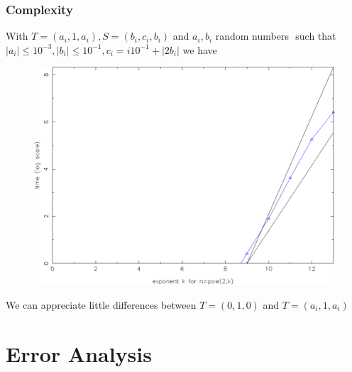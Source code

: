 \documentclass{beamer}
\newcommand{\tc}{ $ such that $ }
\theoremstyle{definition} \newtheorem{de}{Def}
\theoremstyle{remark} \newtheorem{os}[de]{Remark}
\theoremstyle{plain} \newtheorem{te}[de]{Teo}
\theoremstyle{plain} \newtheorem{co}[de]{Cor}
\theoremstyle{plain} \newtheorem{pr}[de]{Prop}
\theoremstyle{plain} \newtheorem{lem}[de]{Lemm}
\theoremstyle{remark} \newtheorem{rem}[de]{Remark}
\begin{document}
\begin{frame}
  \frametitle{Complexity}
  With $T=(a_i,1,a_i),S=(b_i, c_i ,b_i)$ and $a_i, b_i$ random numbers $\tc |a_i|\le 10^{-3}, |b_i|\le 10^{-1}, c_i = i 10^{-1} + |2 b_i|$ we have

  \begin{figure}
    \centering
    \includegraphics[scale=0.3]{images/Tempi_con_riferimento_quadrato_13_matrici_complete.pdf}
  \end{figure}

We can appreciate little differences between $T=(0,1,0)$ and $T=(a_i,1,a_i)$

\end{frame}


\section{Error Analysis}
\end{document}
